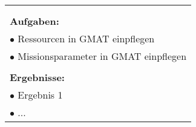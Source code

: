 \begin{table}[!h]
\begin{center}
\begin{tabular}{|p{35mm}||p{55mm}|p{50mm}||p{40mm}|}
   \multicolumn{4}{|p{150mm}|}{}\\
   \multicolumn{4}{|p{150mm}|}{}\\
   \multicolumn{4}{|p{150mm}|}{\textbf{Aufgaben:}}\\
   \multicolumn{4}{|p{150mm}|}{$\bullet$ Ressourcen in GMAT einpflegen}\\
   \multicolumn{4}{|p{150mm}|}{$\bullet$ Missionsparameter in GMAT einpflegen}\\
   \multicolumn{4}{|p{150mm}|}{}\\
   \multicolumn{4}{|p{150mm}|}{\textbf{Ergebnisse:}}\\
   \multicolumn{4}{|p{150mm}|}{$\bullet$ Ergebnis 1}\\
   \multicolumn{4}{|p{150mm}|}{$\bullet$ ...}\\
   \hline
  \end{tabular}
 \end{center}
\end{table}

